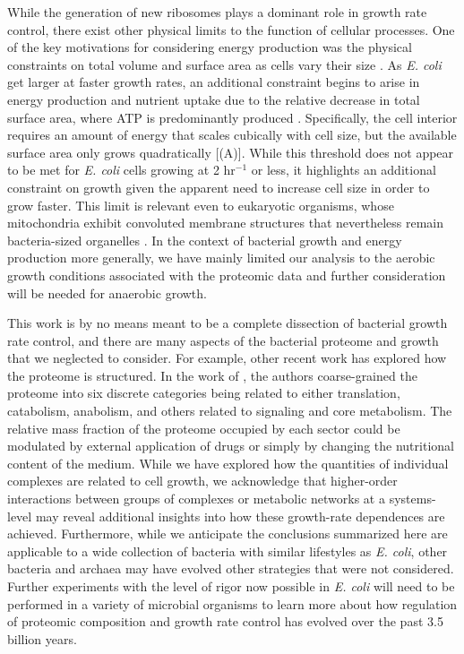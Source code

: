 While the generation of new ribosomes plays a dominant role in growth rate
control, there exist other physical limits to the function of cellular
processes. One of the key motivations for considering energy production was the
physical constraints on total volume and surface area as cells vary their size
\citep{harris2018, ojkic2019}. As \textit{E. coli} get larger at faster growth
rates, an additional constraint begins to arise in energy production and
nutrient uptake due to the relative decrease in total surface area, where ATP is
predominantly produced \citep{szenk2017}. Specifically, the cell interior
requires an amount of energy that scales cubically with cell size, but the
available surface area only grows quadratically [(A)]. While
this threshold does not appear to be met for \textit{E. coli} cells growing at 2
hr$^{-1}$ or less, it highlights an additional constraint on growth given the
apparent need to increase cell size in order to grow faster. This limit is
relevant even to eukaryotic organisms, whose mitochondria exhibit convoluted
membrane structures that nevertheless remain bacteria-sized organelles
\citep{guo2018}. In the context of bacterial growth and energy production more
generally, we have mainly limited our analysis to the aerobic growth conditions
associated with the proteomic data and further consideration will be needed for
anaerobic growth.

This work is by no means meant to be a complete dissection of bacterial
growth rate control, and there are many aspects of the bacterial proteome and
growth that we neglected to consider. For example, other recent work
\citep{liebermeister2014, hui2015, schmidt2016} has explored how the proteome is
structured. In the work of
\cite{hui2015}, the authors coarse-grained the proteome into six discrete
categories being related to either translation, catabolism, anabolism, and
others related to signaling and core metabolism. The relative mass fraction of
the proteome occupied by each sector could be modulated by external application
of drugs or simply by changing the nutritional content of the medium. While we
have explored how the quantities of individual complexes are related to cell
growth, we acknowledge that higher-order interactions between groups of
complexes or metabolic networks at a systems-level may reveal additional
insights into how these growth-rate dependences are achieved.
Furthermore, while we anticipate the conclusions summarized here are applicable
to a wide collection of bacteria with similar lifestyles as \textit{E. coli},
other bacteria and archaea may have evolved other strategies that were not
considered. Further experiments with the level of rigor now possible in
\textit{E. coli} will need to be performed in a variety of microbial organisms
to learn more about how regulation of proteomic composition and  growth rate
control has evolved over the past 3.5 billion years.
